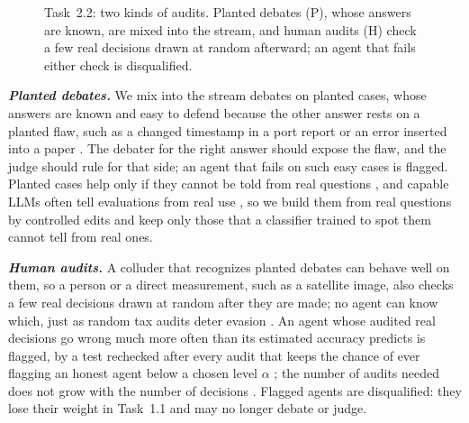\documentclass[12pt,letterpaper]{article}
\newcommand{\slab}[1]{\textbf{\textit{#1}}}
\begin{document}
\begin{figure}[t]
\begin{minipage}[c]{0.44\textwidth}
\centering
{}
\end{minipage}\hfill
\begin{minipage}[c]{0.53\textwidth}
\caption{Task~2.2: two kinds of audits. Planted debates (P), whose answers are known, are mixed into the stream, and human audits (H) check a few real decisions drawn at random afterward; an agent that fails either check is disqualified.}
\label{fig:t22}
\end{minipage}
\end{figure}
\slab{Planted debates.} We mix into the stream debates on planted cases, whose answers are known and easy to defend because the other answer rests on a planted flaw, such as a changed timestamp in a port report or an error inserted into a paper \citep{schroter2008errors}. The debater for the right answer should expose the flaw, and the judge should rule for that side; an agent that fails on such easy cases is flagged. Planted cases help only if they cannot be told from real questions \citep{checco2018gold}, and capable LLMs often tell evaluations from real use \citep{needham2025evaluated}, so we build them from real questions by controlled edits and keep only those that a classifier trained to spot them cannot tell from real ones.

\slab{Human audits.} A colluder that recognizes planted debates can behave well on them, so a person or a direct measurement, such as a satellite image, also checks a few real decisions drawn at random after they are made; no agent can know which, just as random tax audits deter evasion \citep{allingham1972tax,gans2026randomized}. An agent whose audited real decisions go wrong much more often than its estimated accuracy predicts is flagged, by a test rechecked after every audit that keeps the chance of ever flagging an honest agent below a chosen level $\alpha$ \citep{ramdas2023game}; the number of audits needed does not grow with the number of decisions \citep{steinhardt2016avoiding}. Flagged agents are disqualified: they lose their weight in Task~1.1 and may no longer debate or judge.
\end{document}
